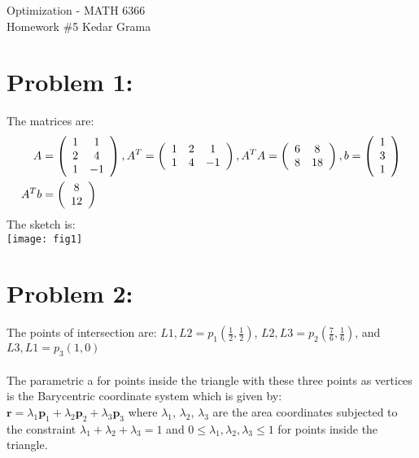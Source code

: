 \documentclass[12pt]{report}
\begin{document}
\begin{center}
	\large{Optimization - MATH 6366}\\
	\hfill \hfill \large{Homework \#5} \hfill \large{Kedar Grama}\\
\end{center}

\section*{Problem 1:}
The matrices are:
\begin{align*}
A &= \left(\begin{array}{c c}
1 & 1\\
2 & 4\\
1 & -1
\end{array} \right),
A^T = \left(\begin{array}{c c c}
1 & 2 & 1\\
1 & 4 & -1
\end{array} \right),
A^TA = \left(\begin{array}{c c}
6 & 8\\
8 & 18\\
\end{array} \right),
b = \left(\begin{array}{c c}
1\\
3\\
1
\end{array} \right)\\
A^Tb&= \left(\begin{array}{c c}
8\\
12
\end{array} \right)\\
\end{align*}
The sketch is:\\
\texttt{[image: fig1]}

\section*{Problem 2:}
The points of intersection are:
$L1,L2 = p_1(\frac{1}{2},\frac{1}{2})$,
$L2,L3 = p_2(\frac{7}{6},\frac{1}{6})$, and \\
$L3,L1 = p_3(1,0)$\\
\\
The parametric a for points inside the triangle with these three points as vertices is the
Barycentric coordinate system which is given by:\\
$\textbf{r} = \lambda_{1} \textbf{p}_{1} + \lambda_{2} \textbf{p}_{2} + \lambda_{3}
\textbf{p}_{3} $
where $\lambda_{1}$, $\lambda_{2}$, $\lambda_{3}$ are the area coordinates subjected to the
constraint $\lambda_{1} + \lambda_{2} + \lambda_{3} = 1$ and $0 \leq \lambda_{1},\lambda_{2},
\lambda_{3}\leq 1$ for points inside the triangle.
\end{document}
